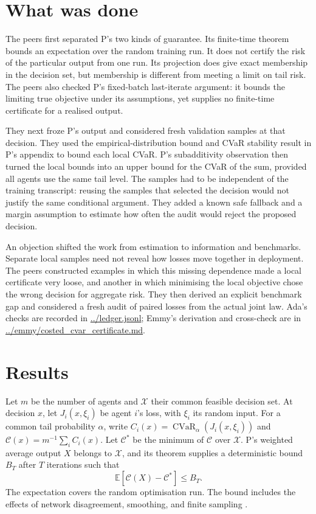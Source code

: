 \documentclass{article}
\begin{document}
\section{What was done}

The peers first separated P's two kinds of guarantee. Its finite-time theorem bounds an expectation over the
random training run. It does not certify the risk of the particular output from one run. Its projection does
give exact membership in the decision set, but membership is different from meeting a limit on tail risk. The
peers also checked P's fixed-batch last-iterate argument: it bounds the limiting true objective under its
assumptions, yet supplies no finite-time certificate for a realised output.

They next froze P's output and considered fresh validation samples at that decision. They used the
empirical-distribution bound and CVaR stability result in P's appendix to bound each local CVaR. P's
subadditivity observation then turned the local bounds into an upper bound for the CVaR of the sum, provided
all agents use the same tail level. The samples had to be independent of the training transcript: reusing the
samples that selected the decision would not justify the same conditional argument. They added a known safe
fallback and a margin assumption to estimate how often the audit would reject the proposed decision.

An objection shifted the work from estimation to information and benchmarks. Separate local samples need not
reveal how losses move together in deployment. The peers constructed examples in which this missing dependence
made a local certificate very loose, and another in which minimising the local objective chose the wrong
decision for aggregate risk. They then derived an explicit benchmark gap and considered a fresh audit of
paired losses from the actual joint law. Ada's checks are recorded in \url{../ledger.jsonl}; Emmy's derivation
and cross-check are in \url{../emmy/costed_cvar_certificate.md}.

\section{Results}

Let \(m\) be the number of agents and \(\mathcal X\) their common feasible decision set. At decision \(x\),
let \(J_i(x,\xi_i)\) be agent \(i\)'s loss, with \(\xi_i\) its random input. For a common tail probability
\(\alpha\), write \(C_i(x)=\operatorname{CVaR}_{\alpha}(J_i(x,\xi_i))\) and \(\mathcal C(x)=m^{-1}\sum_i
C_i(x)\). Let \(\mathcal C^*\) be the minimum of \(\mathcal C\) over \(\mathcal X\). P's weighted average
output \(X\) belongs to \(\mathcal X\), and its theorem supplies a deterministic bound \(B_T\) after \(T\)
iterations such that
\[
\mathbb E[\mathcal C(X)-\mathcal C^*]\le B_T.
\]
The expectation covers the random optimisation run. The bound includes the effects of network disagreement,
smoothing, and finite sampling \cite{P}.
\end{document}
